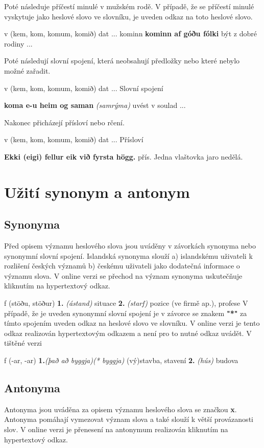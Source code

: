 Poté následuje příčestí minulé v mužském rodě. V případě, že se příčestí minulé vyskytuje jako heslové slovo ve slovníku, je uveden odkaz na toto heslové slovo.

 {\small{ v (kem, kom, komum, komið) dat}
...
{\small{kominn}} 
\textbf{kominn af góðu fólki} {být z dobré rodiny}
...}

Poté následují slovní spojení, která neobsahují předložky nebo které nebylo možné zařadit.

 {\small{ v (kem, kom, komum, komið) dat}
... 
{\small{Slovní spojení}}

\textbf{koma e-u heim og saman} \textit{(samrýma)} {uvést v soulad} 
...}

Nakonec přicházejí přísloví nebo rčení. 

 {\small{ v (kem, kom, komum, komið) dat}
...
{\small{Přísloví}}

\textbf{Ekki (eigi) fellur eik við fyrsta högg.} \footnotesize{přís.} {Jedna vlaštovka jaro nedělá.} }

\section{Užití synonym a antonym}

\subsection{Synonyma}
Před opisem významu heslového slova jsou uváděny v závorkách synonyma nebo synonymní slovní spojení. Islandská synonyma slouží a) islandskému uživateli k rozlišení českých významů b) českému uživateli  jako dodatečná informace o významu slova. V online verzi se přechod na význam synonyma uskutečňuje kliknutím na hypertextový odkaz. 

 {\small{ f (stöðu, stöður) }
\textbf{1.} \textit{(ástand)} {situace} 
\textbf{2.} \textit{(starf)} {pozice (ve firmě ap.), profese}}
V případě, že je uveden synonymní slovní spojení je v závorce se znakem \textbf{"*"} za tímto spojením uveden odkaz na heslové slovo ve slovníku. V online verzi je tento odkaz realizován hypertextovým odkazem a není pro to nutné odkaz uvádět.
V tištěné verzi

 {\small{ f (-ar, -ar) }
\textbf{1.}\textit{(það að byggja)(* byggja)} {(vý)stavba, stavení} 
\textbf{2.} \textit{(hús)} {budova }}

\subsection{Antonyma}
Antonyma jsou uváděna za opisem významu heslového slova se značkou \textbf{x}. Antonyma pomáhají vymezovat význam slova a také slouží k větší provázanosti slov. V online verzi je přenesení na antonymum realizován kliknutím na hypertextový odkaz.

